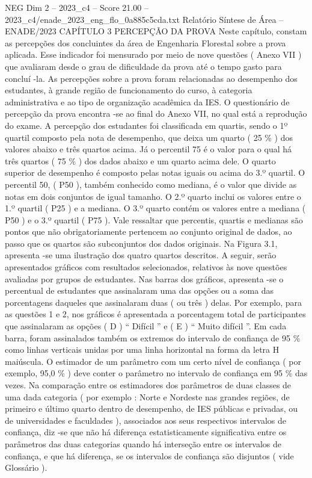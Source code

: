 \begin{textsample}{NEG Dim 2 – 2023\_c4 – Score 21.00 – 2023\_c4/enade\_2023\_eng\_flo\_0a885c5cda.txt}  \label{ex:f2_neg_419}
Relatório Síntese de Área – ENADE/2023 CAPÍTULO 3 PERCEPÇÃO DA PROVA Neste capítulo, constam as percepções dos concluintes da área de Engenharia Florestal sobre a prova aplicada.
Esse indicador foi mensurado por meio de nove questões ( Anexo VII ) que avaliaram desde o grau de dificuldade da prova até o tempo gasto para concluí -la.
As percepções sobre a prova foram relacionadas ao desempenho dos estudantes, à grande região de funcionamento do curso, à categoria administrativa e ao tipo de organização acadêmica da IES.
O questionário de percepção da prova encontra -se ao final do Anexo VII, no qual está a reprodução do exame.
A percepção dos estudantes foi classificada em quartis, sendo o 1º quartil composto pela nota de desempenho, que deixa um quarto ( 25 \% ) dos valores abaixo e três quartos acima.
Já o percentil 75 é o valor para o qual há três quartos ( 75 \% ) dos dados abaixo e um quarto acima dele.
O quarto superior de desempenho é composto pelas notas iguais ou acima do 3.º quartil.
O percentil 50, ( P50 ), também conhecido como mediana, é o valor que divide as notas em dois conjuntos de igual tamanho.
O 2.º quarto inclui os valores entre o 1.º quartil ( P25 ) e a mediana.
O 3.º quarto contém os valores entre a mediana ( P50 ) e o 3.º quartil ( P75 ).
Vale ressaltar que percentis, quartis e medianas são pontos que não obrigatoriamente pertencem ao conjunto original de dados, ao passo que os quartos são subconjuntos dos dados originais.
Na Figura 3.1, apresenta -se uma ilustração dos quatro quartos descritos.
A seguir, serão apresentados gráficos com resultados selecionados, relativos às nove questões avaliadas por grupos de estudantes.
Nas barras dos gráficos, apresenta -se o percentual de estudantes que assinalaram uma das opções ou a soma das porcentagens daqueles que assinalaram duas ( ou três ) delas.
Por exemplo, para as questões 1 e 2, nos gráficos é apresentada a porcentagem total de participantes que assinalaram as opções ( D ) “ Difícil ” e ( E ) “ Muito difícil ”.
Em cada barra, foram assinalados também os extremos do intervalo de confiança de 95 \% como linhas verticais unidas por uma linha horizontal na forma da letra H maiúscula.
O estimador de um parâmetro com um certo nível de confiança ( por exemplo, 95,0 \% ) deve conter o parâmetro no intervalo de confiança em 95 \% das vezes.
Na comparação entre os estimadores dos parâmetros de duas classes de uma dada categoria ( por exemplo : Norte e Nordeste nas grandes regiões, de primeiro e último quarto dentro de desempenho, de IES públicas e privadas, ou de universidades e faculdades ), associados aos seus respectivos intervalos de confiança, diz -se que não há diferença estatisticamente significativa entre os parâmetros das duas categorias quando há interseção entre os intervalos de confiança, e que há diferença, se os intervalos de confiança são disjuntos ( vide Glossário ).

\end{textsample}
